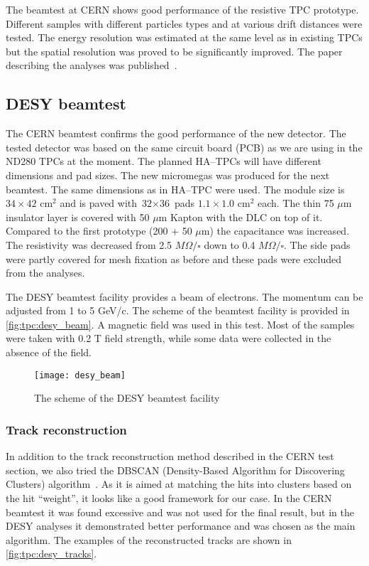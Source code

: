 \documentclass[../main.tex]{subfiles}
\begin{document}
The beamtest at CERN shows good performance of the resistive TPC prototype. Different samples with different particles types and at various drift distances were tested. The energy resolution was estimated at the same level as in existing TPCs but the spatial resolution was proved to be significantly improved. The paper describing the analyses was published~\cite{Attie2019b}.

\subsection{DESY beamtest}
The CERN beamtest confirms the good performance of the new detector. The tested detector was based on the same circuit board (PCB) as we are using in the ND280 TPCs at the moment. The planned HA--TPCs will have different dimensions and pad sizes. The new micromegas was produced for the next beamtest. The same dimensions as in HA--TPC were used. The module size is $\text{34}\times\text{42}\text{ cm}^2$ and is paved with $\text{32}\times\text{36}$ pads $\text{1.1}\times\text{1.0}\text{ cm}^2$ each. The thin 75 $\mu\text{m}$ insulator layer is covered with 50 $\mu\text{m}$ Kapton with the DLC on top of it. Compared to the first prototype (200 + 50 $\mu\text{m}$) the capacitance was increased. The resistivity was decreased from 2.5 $M\Omega/\square$ down to 0.4 $M\Omega/\square$. The side pads were partly covered for mesh fixation as before and these pads were excluded from the analyses.

The DESY beamtest facility provides a beam of electrons. The momentum can be adjusted from 1 to 5 GeV/c. The scheme of the beamtest facility is provided in \autoref{fig:tpc:desy_beam}. A magnetic field was used in this test. Most of the samples were taken with 0.2 T field strength, while some data were collected in the absence of the field.

\begin{figure}[!ht]
  \centering
  \texttt{[image: desy\_beam]}
  \caption{The scheme of the DESY beamtest facility}
  \label{fig:tpc:desy_beam}
\end{figure}

\subsubsection{Track reconstruction}
In addition to the track reconstruction method described in the CERN test section, we also tried the DBSCAN (Density-Based Algorithm for Discovering Clusters) algorithm~\cite{Ester1996}. As it is aimed at matching the hits into clusters based on the hit ``weight'', it looks like a good framework for our case. In the CERN beamtest it was found excessive and was not used for the final result, but in the DESY analyses it demonstrated better performance and was chosen as the main algorithm. The examples of the reconstructed tracks are shown in \autoref{fig:tpc:desy_tracks}.
\end{document}
